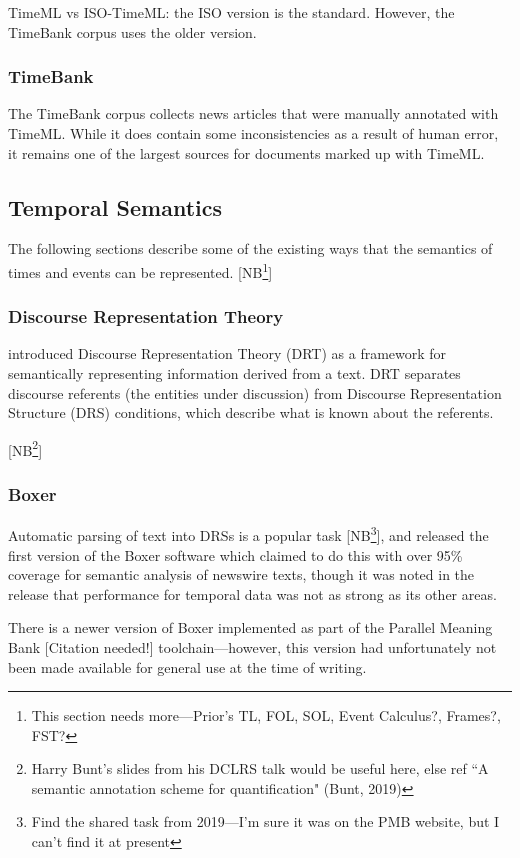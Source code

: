 \documentclass[a4paper,12pt,leqno]{article}
\newcommand{\citeneeded}[1][]{{\color{red}[Citation needed!#1]}}
\newcommand{\selfnote}[1]{{\color{red}[NB\footnote{{\color{red}#1}}]}}
\begin{document}
TimeML vs ISO-TimeML: the ISO version is the standard. However, the TimeBank corpus uses the older version.

\subsubsection{TimeBank}\label{ssub:timebank}
The TimeBank corpus \citep{pustejovsky2006timebank} collects news articles that were manually annotated with TimeML. While it does contain some inconsistencies as a result of human error, it remains one of the largest sources for documents marked up with TimeML.
\subsection{Temporal Semantics}\label{sub:semantics}
The following sections describe some of the existing ways that the semantics of times and events can be represented. \selfnote{This section needs more---Prior's TL, FOL, SOL, Event Calculus?, Frames?, FST?}
\subsubsection{Discourse Representation Theory}\label{ssub:drt}
\citet{Kamp1993} introduced Discourse Representation Theory (DRT) as a framework for semantically representing information derived from a text. DRT separates discourse referents (the entities under discussion) from Discourse Representation Structure (DRS) conditions, which describe what is known about the referents.

\selfnote{Harry Bunt's slides from his DCLRS talk would be useful here, else ref ``A semantic annotation scheme for quantiﬁcation" (Bunt, 2019)}
\subsubsection{Boxer}\label{ssub:boxer}
Automatic parsing of text into DRSs is a popular task \selfnote{Find the shared task from 2019---I'm sure it was on the PMB website, but I can't find it at present}, and \citet{Bos2008} released the first version of the Boxer software which claimed to do this with over 95\% coverage for semantic analysis of newswire texts, though it was noted in the release that performance for temporal data was not as strong as its other areas.

There is a newer version of Boxer implemented as part of the Parallel Meaning Bank \citeneeded{} toolchain---however, this version had unfortunately not been made available for general use at the time of writing.
\end{document}
